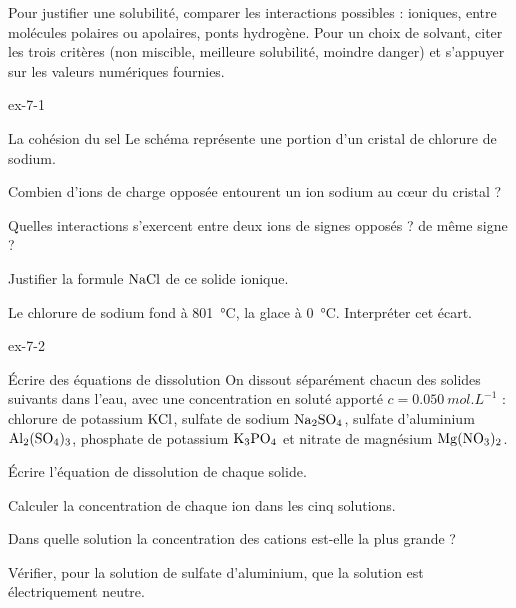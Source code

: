 \begin{rediger}
Pour justifier une solubilité, comparer les interactions possibles : ioniques, entre molécules polaires ou apolaires,
ponts hydrogène. Pour un choix de solvant, citer les trois critères (non miscible, meilleure solubilité, moindre danger) et
s'appuyer sur les valeurs numériques fournies.
\end{rediger}
\exercices

\begin{blocLivre}{ex-7-1}
\begin{exercice}[1]{La cohésion du sel}
Le schéma représente une portion d'un cristal de chlorure de sodium.
\begin{questions}
\item Combien d'ions de charge opposée entourent un ion sodium au cœur du cristal ?
\item Quelles interactions s'exercent entre deux ions de signes opposés ? de même signe ?
\item Justifier la formule $\ce{NaCl}$ de ce solide ionique.
\item Le chlorure de sodium fond à \qty{801}{\degreeCelsius}, la glace à \qty{0}{\degreeCelsius}. Interpréter cet écart.
\end{questions}
\end{exercice}
\end{blocLivre}
\begin{blocLivre}{ex-7-2}
\begin{exercice}[1]{Écrire des équations de dissolution}
On dissout séparément chacun des solides suivants dans l'eau, avec une concentration en soluté apporté
$c=\qty{0,050}{mol.L^{-1}}$ : chlorure de potassium $\ce{KCl}$, sulfate de sodium $\ce{Na2SO4}$, sulfate d'aluminium $\ce{Al2(SO4)3}$, phosphate de
potassium $\ce{K3PO4}$ et nitrate de magnésium $\ce{Mg(NO3)2}$.
\begin{questions}
\item Écrire l'équation de dissolution de chaque solide.
\item Calculer la concentration de chaque ion dans les cinq solutions.
\item Dans quelle solution la concentration des cations est-elle la plus grande ?
\item Vérifier, pour la solution de sulfate d'aluminium, que la solution est électriquement neutre.
\end{questions}
\end{exercice}
\end{blocLivre}
